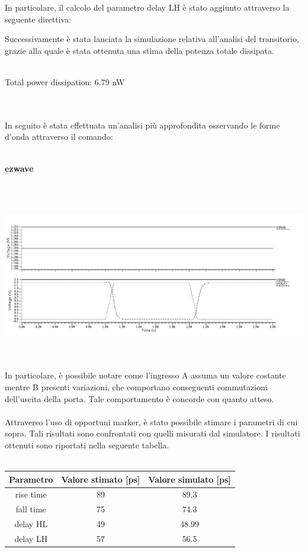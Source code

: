 \documentclass[11pt,  english, makeidx, a4paper, titlepage, oneside]{book}
\newenvironment{listato}{\footnotesize} {\normalsize }
\begin{document}
In particolare, il calcolo del parametro delay LH è stato aggiunto attraverso la seguente direttiva:
\begin{center}
\begin{listato}
	\centerline{}
\end{listato}
\end{center}
\vspace{0.3cm}
Successivamente è stata lanciata la simulazione relativa all'analisi del transitorio, grazie alla quale è stata ottenuta una stima della potenza totale dissipata.
\\\\
\centerline{Total power dissipation: 6.79 nW}
\\\\
In seguito è stata effettuata un'analisi più approfondita osservando le forme d'onda attraverso il comando:
\\\\
\centerline{\textbf{ezwave}}
\\\\
\centerline{\includegraphics[width=14cm]{./img/Lab_5/waveform_1.png}}
\\\\
In particolare, è possibile notare come l'ingresso A assuma un valore costante mentre B presenti variazioni, che comportano conseguenti commutazioni dell'uscita della porta. Tale comportamento è concorde con quanto atteso.
\\\\
Attraverso l'uso di opportuni marker, è stato possibile stimare i parametri di cui sopra. Tali risultati sono confrontati con quelli misurati dal simulatore. I risultati ottenuti sono riportati nella seguente tabella.
\\\\
\begin{center}
	\begin{tabular}{|c|c|c|}
	\hline
	Parametro & Valore stimato [ps] & Valore simulato [ps] \\
	\hline
	 rise time & 89 &  89.3 \\
	\hline
	 fall time & 75 & 74.3 \\
	\hline
	delay HL & 49 &  48.99 \\
	\hline
	delay LH & 57  &  56.5 \\
	\hline
	\end{tabular}	
\end{center}
\end{document}
